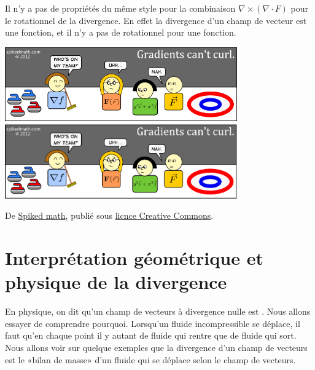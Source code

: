 \begin{remark}
    Il n'y a pas de propriétés du même style pour la combinaison $\nabla\times(\nabla\cdot F)$ pour le rotationnel de la divergence. En effet la divergence d'un champ de vecteur est une fonction, et il n'y a pas de rotationnel pour une fonction.
\end{remark}

\begin{center}
           \ifpdf
            \includegraphics[width=10cm]{501-curling-with-gradients.png}
        \else
            \includegraphics[width=10cm]{501-curling-with-gradients.eps}
        \fi

        {\tiny De \href{http://spikedmath.com/501.html}{Spiked math}, publié sous \href{http://creativecommons.org/licenses/by-nc-sa/2.5/ca/}{licnce Creative Commons}.}
\end{center}


\section[Interprétation de la divergence]{Interprétation géométrique et physique de la divergence}


En physique, on dit qu'un champ de vecteurs à divergence nulle est . Nous allons essayer de comprendre pourquoi. Lorsqu'un fluide incompressible se déplace, il faut qu'en chaque point il y autant de fluide qui rentre que de fluide qui sort. Nous allons voir sur quelque exemples que la divergence d'un champ de vecteurs est le «bilan de masse» d'un fluide qui se déplace selon le champ de vecteurs.

